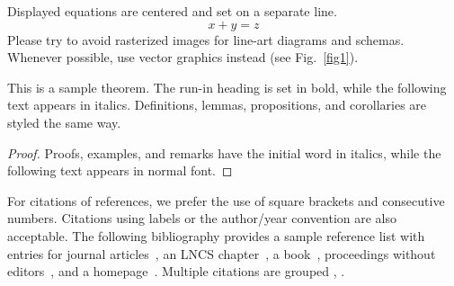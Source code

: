 \documentclass[runningheads]{llncs}
\begin{document}
\noindent Displayed equations are centered and set on a separate
line.
\begin{equation}
x + y = z
\end{equation}
Please try to avoid rasterized images for line-art diagrams and
schemas. Whenever possible, use vector graphics instead (see
Fig.~\ref{fig1}).


\begin{theorem}
This is a sample theorem. The run-in heading is set in bold, while
the following text appears in italics. Definitions, lemmas,
propositions, and corollaries are styled the same way.
\end{theorem}
%
%
\begin{proof}
Proofs, examples, and remarks have the initial word in italics,
while the following text appears in normal font.
\end{proof}
For citations of references, we prefer the use of square brackets
and consecutive numbers. Citations using labels or the author/year
convention are also acceptable. The following bibliography provides
a sample reference list with entries for journal
articles~\cite{ref_article1}, an LNCS chapter~\cite{ref_lncs1}, a
book~\cite{ref_book1}, proceedings without editors~\cite{ref_proc1},
and a homepage~\cite{ref_url1}. Multiple citations are grouped
\cite{ref_article1,ref_lncs1,ref_book1},
\cite{ref_article1,ref_book1,ref_proc1,ref_url1}.
%
%


%
% 
% 
%
\end{document}
